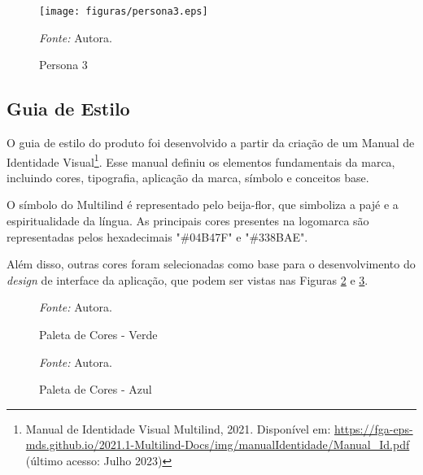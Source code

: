 \begin{figure}[h!]
	\centering
	\caption{Persona 3}
	\begin{adjustbox}{center}
		\texttt{[image: figuras/persona3.eps]}
	\end{adjustbox}
	\begin{tablenotes}[flushleft]
		\centering
		\item \textit{Fonte:} Autora.
	\end{tablenotes}
	\label{fig15}
\end{figure}

\subsection{Guia de Estilo}
\label{Guia de Estilo}
O guia de estilo do produto foi desenvolvido a partir da criação de um Manual de Identidade Visual\footnote{Manual de Identidade Visual Multilind, 2021. Disponível
em: \url{https://fga-eps-mds.github.io/2021.1-Multilind-Docs/img/manualIdentidade/Manual_Id.pdf} (último acesso: Julho 2023)}. Esse manual definiu os elementos fundamentais da marca, incluindo cores, tipografia, aplicação da marca, símbolo e conceitos base.

O símbolo do Multilind é representado pelo beija-flor, que simboliza a pajé e a espiritualidade da língua. As principais cores presentes na logomarca são representadas pelos hexadecimais "\#04B47F" e "\#338BAE".

Além disso, outras cores foram selecionadas como base para o desenvolvimento do \textit{design} de interface da aplicação, que podem ser vistas nas Figuras \ref{fig16} e \ref{fig17}.

\begin{figure}[h!]
	\centering
	\caption{Paleta de Cores - Verde}
	\begin{tablenotes}[flushleft]
		\centering
		\item \textit{Fonte:} Autora.
	\end{tablenotes}
	\label{fig16}
\end{figure}

\begin{figure}[h!]
	\centering
	\caption{Paleta de Cores - Azul}
	\begin{tablenotes}[flushleft]
		\centering
		\item \textit{Fonte:} Autora.
	\end{tablenotes}
	\label{fig17}
\end{figure}

